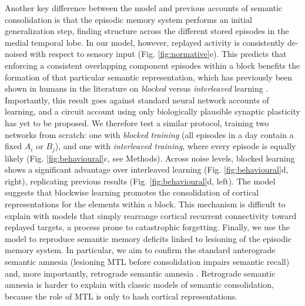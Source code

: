\documentclass{article}
\begin{document}
Another key difference between the model and previous accounts of semantic consolidation is that the episodic memory system performs an initial generalization step, finding structure across the different stored episodes in the medial temporal lobe. In our model, however, replayed activity is consistently de-noised with respect to sensory input (Fig. \ref{fig:normative}e). This predicts that enforcing a consistent overlapping component episodes within a block benefits the formation of that particular semantic representation, which has previously been shown in humans in the literature on \textit{blocked} versus \textit{interleaved} learning . Importantly, this result goes against standard neural network accounts of learning, and a circuit account using only biologically plausible synaptic plasticity has yet to be proposed. We therefore test a similar protocol, training two networks from scratch: one with \textit{blocked training} (all episodes in a day contain a fixed $A_i$ or $B_j$), and one with \textit{interleaved training}, where every episode is equally likely (Fig. \ref{fig:behavioural}c, see Methods). Across noise levels, blocked learning shows a significant advantage over interleaved learning (Fig. \ref{fig:behavioural}d, right), replicating previous results (Fig. \ref{fig:behavioural}d, left). The model suggests that blockwise learning promotes the consolidation of cortical representations for the elements within a block. This mechanism is difficult to explain with models that simply rearrange cortical recurrent connectivity toward replayed targets, a process prone to catastrophic forgetting.
\newline\newline
Finally, we use the model to reproduce semantic memory deficits linked to lesioning of the episodic memory system. In particular, we aim to confirm the standard anterograde semantic amnesia (lesioning MTL before consolidation impairs semantic recall) and, more importantly, retrograde semantic amnesia . Retrograde semantic amnesia is harder to explain with classic models of semantic consolidation, because the role of MTL is only to hash cortical representations.
\newline\newline
\end{document}
